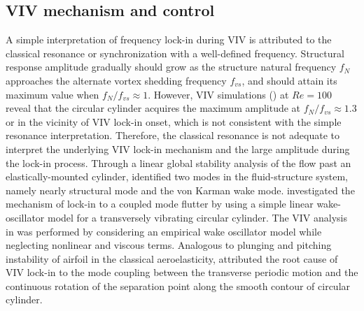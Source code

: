 \documentclass{jfm}
\begin{document}
\subsection{VIV mechanism and control}
A simple interpretation of frequency lock-in during VIV is attributed 
to the classical resonance or synchronization with a well-defined frequency. 
Structural response amplitude gradually should grow as the structure 
natural frequency $f_{N}$ approaches 
the alternate vortex shedding frequency $f_{vs}$, and should attain its 
maximum value when $f_N/f_{vs} \approx 1$. 
However, VIV simulations (\cite{Singh2005,Tham2015}) at $Re=100$ reveal that 
the circular cylinder acquires the maximum amplitude at $f_N/ f_{vs} \approx 1.3$ or in the vicinity 
of VIV lock-in onset, which is not consistent with the simple resonance interpretation. 
Therefore, the classical resonance is not adequate to interpret the underlying VIV lock-in mechanism 
and the large amplitude during the lock-in process. 
%
Through a linear global stability analysis of the flow past an elastically-mounted 
cylinder, \cite{cossu2000} identified two modes in the fluid-structure 
system, namely nearly structural mode and the von Karman wake mode.
% 
\cite{DeLangre2006} investigated the mechanism of lock-in to a coupled mode 
flutter by using a simple linear wake-oscillator model 
for a transversely vibrating circular cylinder. 
%
The VIV analysis in \cite{DeLangre2006} was performed 
by considering an empirical wake oscillator model while 
neglecting nonlinear and viscous terms. 
%
Analogous to plunging and pitching instability of airfoil in the classical aeroelasticity, 
\cite{DeLangre2006} attributed the root cause of VIV lock-in to the mode coupling between 
the transverse periodic motion and the continuous rotation of the separation point 
along the smooth contour of circular cylinder. 
\end{document}
